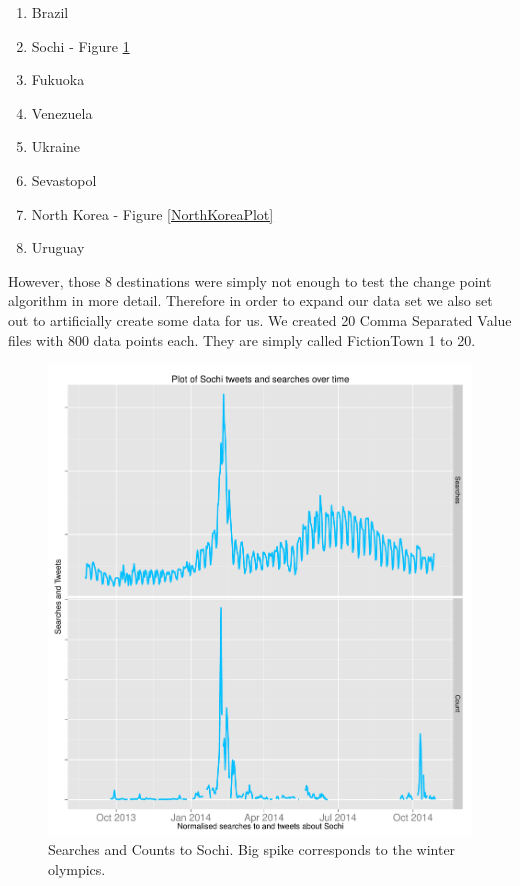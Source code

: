 \documentclass[minf,twoside,singlespacing,parskip,notimes,deptreport]{infthesis} %
\begin{document}
\begin{enumerate}
\item Brazil
\item Sochi - Figure \ref{sochifinalplot}
\item Fukuoka
\item Venezuela
\item Ukraine
\item Sevastopol
\item North Korea - Figure \ref{NorthKoreaPlot}
\item Uruguay
\end{enumerate}

However, those 8 destinations were simply not enough to test the change point algorithm in more detail. Therefore in order to expand our data set we also set out to artificially create some data for us. We created 20 Comma Separated Value files with 800 data points each. They are simply called FictionTown 1 to 20. 

\begin{figure}[p!]
\begin{center}
\includegraphics[width=\textwidth]{Sochi}
\end{center}
\caption{Searches and Counts to Sochi. Big spike corresponds to the winter olympics. }
\label{sochifinalplot}
\end{figure}
\end{document}
